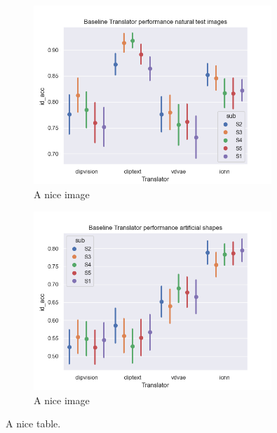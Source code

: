 \begin{figure}[ht]
    \centering
    \includegraphics[width=0.8\textwidth]{plots/baseline_translator_test.png}
    \caption{A nice image}\label{fig:baselinetranslatortest}
\end{figure}

\begin{figure}[ht]
    \centering
    \includegraphics[width=0.8\textwidth]{plots/baseline_translator_art.png}
    \caption{A nice image}\label{fig:baselinetranslatorart}
\end{figure}

\begin{table}[ht]
    \centering

\caption{A nice table.}\label{tab:baseline_translator}
\end{table}


